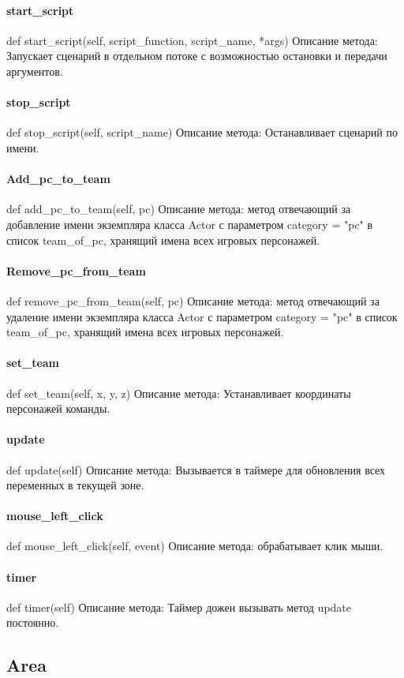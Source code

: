 \paragraph{start\_script}
def start\_script(self, script\_function, script\_name, *args)
Описание метода: Запускает сценарий в отдельном потоке с возможностью остановки и передачи аргументов.
\paragraph{stop\_script}
def stop\_script(self, script\_name)
Описание метода: Останавливает сценарий по имени.
\paragraph{Add\_pc\_to\_team}
def add\_pc\_to\_team(self, pc)
Описание метода: метод отвечающий за добавление имени экземпляра класса Actor с параметром category = "pc" в список team\_of\_pc, хранящий имена всех игровых персонажей.
\paragraph{Remove\_pc\_from\_team}
def remove\_pc\_from\_team(self, pc)
Описание метода: метод отвечающий за удаление имени экземпляра класса Actor с параметром category = "pc" в список team\_of\_pc, хранящий имена всех игровых персонажей.
\paragraph{set\_team}
def set\_team(self, x, y, z)
Описание метода: Устанавливает координаты персонажей команды.
\paragraph{update}
def update(self)
Описание метода: Вызывается в таймере для обновления всех переменных в текущей зоне.
\paragraph{mouse\_left\_click}
def mouse\_left\_click(self, event)
Описание метода: обрабатывает клик мыши.
\paragraph{timer}
def timer(self)
Описание метода: Таймер дожен вызывать метод update постоянно.


\subsection{Area}
